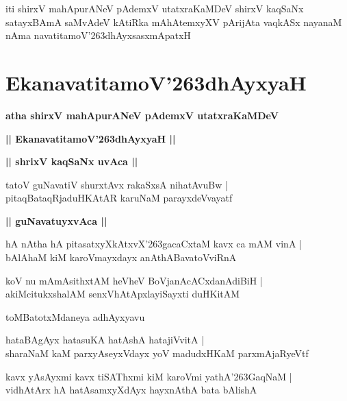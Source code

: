 \documentclass[twoside,12pt,openright]{book}
\def\S{\char'263}
\newcounter{shloka}[chapter]
\def\uvaca#1{\centerline{{\large\textbf{#1}}}}
\begin{document}
\begin{center}
iti shirxV mahApurANeV pAdemxV utatxraKaMDeV shirxV kaqSaNx satayxBAmA saMvAdeV kAtiRka mAhAtemxyXV 
pArijAta vaqkASx nayanaM nAma navatitamoV\S dhAyxsasxmApatxH
\end{center}

\chapter{EkanavatitamoV\S dhAyxyaH}

\begin{center}
{\LARGE\bfseries atha shirxV mahApurANeV pAdemxV utatxraKaMDeV}
\end{center}

\begin{center}
{\LARGE\bfseries || EkanavatitamoV\S dhAyxyaH || }
\end{center}

\uvaca{|| shrixV kaqSaNx uvAca ||}

\begin{shloka}%
tatoV guNavatiV shurxtAvx rakaSxsA nihatAvuBw |\\
pitaqBataqRjaduHKAtAR karuNaM parayxdeVvayatf
\end{shloka}

\uvaca{|| guNavatuyxvAca ||}

\begin{shloka}%
hA nAtha hA pitasatxyXkAtxvX\S gacaCxtaM kavx ca mAM vinA |\\
bAlAhaM kiM karoVmayxdayx anAthABavatoVviRnA 
\end{shloka}

\begin{shloka}%
koV nu mAmAsithxtAM heVheV BoVjanAcACxdanAdiBiH |\\
akiMcitukxshalAM senxVhAtApxlayiSayxti duHKitAM 
\end{shloka}

\begin{center}
toMBatotxMdaneya adhAyxyavu
\end{center}

\begin{shloka}%
hataBAgAyx hatasuKA hatAshA hatajiVvitA |\\
sharaNaM kaM parxyAseyxVdayx yoV madudxHKaM parxmAjaRyeVtf
\end{shloka}

\begin{shloka}%
kavx yAsAyxmi kavx tiSAThxmi kiM karoVmi yathA\S GaqNaM |\\
vidhAtArx hA hatAsamxyXdAyx hayxnAthA bata bAlishA 
\end{shloka}
\end{document}
